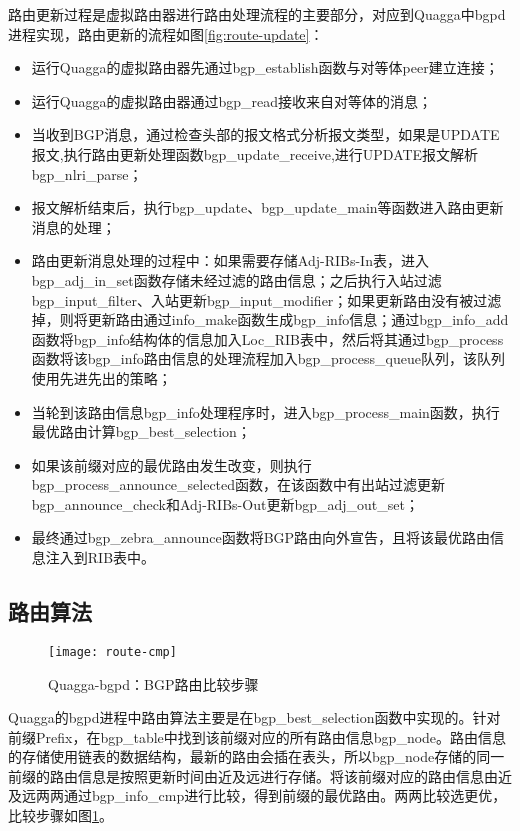 路由更新过程是虚拟路由器进行路由处理流程的主要部分，对应到Quagga中bgpd进程实现，路由更新的流程如图\ref{fig:route-update}：
\begin{itemize}
  \item 运行Quagga的虚拟路由器先通过bgp\_establish函数与对等体peer建立连接；
  \item 运行Quagga的虚拟路由器通过bgp\_read接收来自对等体的消息；
  \item 当收到BGP消息，通过检查头部的报文格式分析报文类型，如果是UPDATE报文,执行路由更新处理函数bgp\_update\_receive,进行UPDATE报文解析bgp\_nlri\_parse；
  \item 报文解析结束后，执行bgp\_update、bgp\_update\_main等函数进入路由更新消息的处理；
  \item 路由更新消息处理的过程中：如果需要存储Adj-RIBs-In表，进入bgp\_adj\_in\_set函数存储未经过滤的路由信息；之后执行入站过滤bgp\_input\_filter、入站更新bgp\_input\_modifier；如果更新路由没有被过滤掉，则将更新路由通过info\_make函数生成bgp\_info信息；通过bgp\_info\_add函数将bgp\_info结构体的信息加入Loc\_RIB表中，然后将其通过bgp\_process函数将该bgp\_info路由信息的处理流程加入bgp\_process\_queue队列，该队列使用先进先出的策略；
  \item 当轮到该路由信息bgp\_info处理程序时，进入bgp\_process\_main函数，执行最优路由计算bgp\_best\_selection；
  \item 如果该前缀对应的最优路由发生改变，则执行bgp\_process\_announce\_selected函数，在该函数中有出站过滤更新bgp\_announce\_check和Adj-RIBs-Out更新bgp\_adj\_out\_set；
  \item 最终通过bgp\_zebra\_announce函数将BGP路由向外宣告，且将该最优路由信息注入到RIB表中。
\end{itemize}

\subsection{路由算法}


\begin{figure}
  \centering
  \texttt{[image: route-cmp]}
  \caption{Quagga-bgpd：BGP路由比较步骤}
  \label{fig:route-cmp}
\end{figure}

Quagga的bgpd进程中路由算法主要是在bgp\_best\_selection函数中实现的。针对前缀Prefix，在bgp\_table中找到该前缀对应的所有路由信息bgp\_node。路由信息的存储使用链表的数据结构，最新的路由会插在表头，所以bgp\_node存储的同一前缀的路由信息是按照更新时间由近及远进行存储。将该前缀对应的路由信息由近及远两两通过bgp\_info\_cmp进行比较，得到前缀的最优路由。两两比较选更优，比较步骤如图\ref{fig:route-cmp}。


